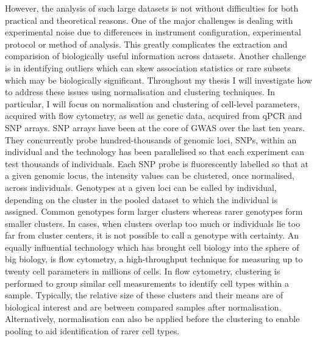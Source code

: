 However, the analysis of such large datasets is not without difficulties for both practical and theoretical reasons.
One of the major challenges is dealing with experimental noise due to differences in instrument configuration, experimental protocol or method of analysis.
This greatly complicates the extraction and comparision of biologically useful information across datasets.
Another challenge is in identifying outliers which can skew association statistics or rare subsets which may be biologically significant.
Throughout my thesis I will investigate how to address these issues using normalisation and clustering techniques.
In particular, I will focus on normalisation and clustering of cell-level parameters, acquired with flow cytometry,
as well as genetic data, acquired from \gls{qPCR} and \gls{SNP} arrays.  
\gls{SNP} arrays have been at the core of \gls{GWAS} over the last ten years.
They concurrently probe hundred-thousands of genomic loci, \glspl{SNP}, within an individual and the technology
has been parallelised so that each experiment can test thousands of individuals.
Each SNP probe is fluorescently labelled so that at a given genomic locus, the intensity values can be clustered,
once normalised, across individuals.
Genotypes at a given loci can be called by individual, depending on the cluster in the pooled dataset to which the individual is assigned.
Common genotypes form larger clusters whereas rarer genotypes form smaller clusters.
In cases, when clusters overlap too much or individuals lie too far from cluster centers, it is not possible to call a genotype with certainty.
An equally influential technology which has brought cell biology into the sphere of big biology, is flow cytometry,
a high-throughput technique for measuring up to twenty cell parameters in millions of cells.
In flow cytometry, clustering is performed to group similar cell measurements to identify cell types within a sample.
Typically, the relative size of these clusters and their means are of biological interest and are between compared samples after normalisation.
Alternatively, normalisation can also be applied before the clustering to enable pooling to aid identification of rarer cell types.

